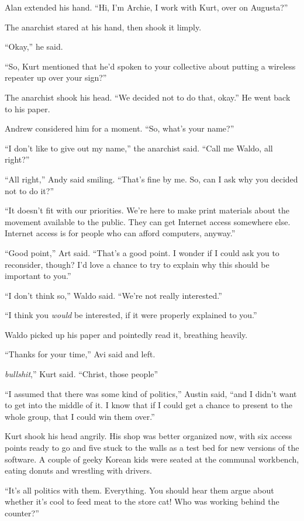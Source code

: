 Alan extended his hand.  ``Hi, I'm Archie, I work with Kurt, over on
Augusta?''

The anarchist stared at his hand, then shook it limply.

``Okay,'' he said.

``So, Kurt mentioned that he'd spoken to your collective about putting
a wireless repeater up over your sign?''

The anarchist shook his head.  ``We decided not to do that, okay.'' He
went back to his paper.

Andrew considered him for a moment.  ``So, what's your name?''

``I don't like to give out my name,'' the anarchist said.  ``Call me
Waldo, all right?''

``All right,'' Andy said smiling.  ``That's fine by me.  So, can I ask
why you decided not to do it?''

``It doesn't fit with our priorities.  We're here to make print
materials about the movement available to the public.  They can get
Internet access somewhere else.  Internet access is for people who can
afford computers, anyway.''

``Good point,'' Art said.  ``That's a good point.  I wonder if I could
ask you to reconsider, though?  I'd love a chance to try to explain
why this should be important to you.''

``I don't think so,'' Waldo said.  ``We're not really interested.''

``I think you \textit{would} be interested, if it were properly
explained to you.''

Waldo picked up his paper and pointedly read it, breathing heavily.

``Thanks for your time,'' Avi said and left.

\textit{bullshit},'' Kurt said.  ``Christ, those people\dash{}''

``I assumed that there was some kind of politics,'' Austin said, ``and
I didn't want to get into the middle of it.  I know that if I could
get a chance to present to the whole group, that I could win them
over.''

Kurt shook his head angrily.  His shop was better organized now, with
six access points ready to go and five stuck to the walls as a test
bed for new versions of the software.  A couple of geeky Korean kids
were seated at the communal workbench, eating donuts and wrestling
with drivers.

``It's all politics with them.  Everything.  You should hear them
argue about whether it's cool to feed meat to the store cat!  Who was
working behind the counter?''


